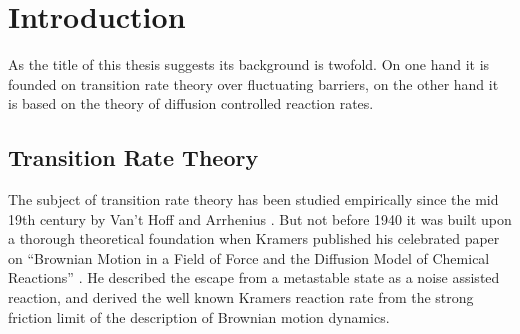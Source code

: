 \setcounter{page}{1}
\chapter{Introduction}
\label{intro}

As the title of this thesis suggests its background is twofold. On one hand it is founded on transition rate theory over fluctuating barriers, on the other hand it is based on the theory of diffusion controlled reaction rates. 
\vspace{-.3 cm}
\section{Transition Rate Theory} 

The subject of transition rate theory has been studied empirically since the mid 19th century by Van't Hoff \cite{hoff1884} and Arrhenius \cite{arrhenius1889}. But not before 1940 it was built upon a thorough theoretical foundation when Kramers published his celebrated paper on ``Brownian Motion in a Field of Force and the Diffusion Model of Chemical Reactions'' \cite{Kramers1940}.  He described the escape from a metastable state as a noise assisted reaction, and derived the well known Kramers reaction rate from the strong friction limit of the description of Brownian motion dynamics.
